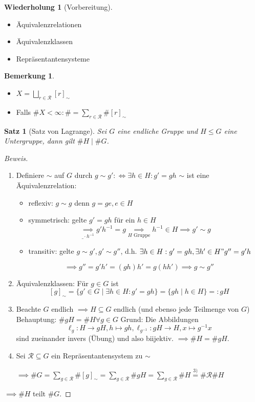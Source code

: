 \documentclass[a4paper]{report}
\theoremstyle{plain}
\newtheorem{satz}[thm]{Satz}
\theoremstyle{definition}
\newtheorem*{bem*}{Bemerkung}
\newtheorem*{whg*}{Wiederholung}
\begin{document}
\begin{whg*}[Vorbereitung]
  \item
\begin{itemize}
\item Äquivalenzrelationen
\item Äquivalenzklassen
\item Repräsentantensysteme
\end{itemize}
\end{whg*}

\begin{bem*} \item
  \begin{itemize}
        \item $X = \bigsqcup_{r \in \mathcal R} [r]_{\sim}$
        \item Falls $\#X < \infty : \# = \sum_{r \in \mathcal R} \# [r]_{\sim}$ %
  \end{itemize}
\end{bem*}

\begin{satz}[Satz von Lagrange]
Sei $G$ eine endliche Gruppe und $H \le G$ eine Untergruppe, dann gilt $\#H \mid \#G$.
\end{satz}
\begin{proof}[Beweis] \item
  \begin{enumerate} [1)]
    \item Definiere $\sim$ auf $G$ durch $g \sim g' :\iff \exists h \in H : g' = gh$
          $\sim$ ist eine Äquivalenzrelation:
          \begin{itemize}
            \item reflexiv: $g \sim g$ denn $g = ge, e \in H$
            \item symmetrisch: gelte $g' = gh$ für ein $h \in H$ $$\underset{\_\cdot h^{-1}}{\implies} g'h^{-1}=g \underset{H \text{ Gruppe}} \implies h^{-1} \in H \implies g' \sim g$$
            \item transitiv: gelte $g \sim g', g' \sim g''$, d.h. $\exists h \in H : g' = gh, \exists h' \in H " g'' = g'h$
          \end{itemize}
            $$\implies g'' = g'h' = (gh)h' = g(hh') \implies g \sim g''$$
    \item Äquivalenzklassen: Für $g \in G$ ist
    $$[g]_{\sim} = \{g' \in G \mid \exists h \in H : g' = gh\} = \{gh \mid h \in H\} =: gH$$
    \item Beachte $G$ endlich $\implies H \subseteq G$ endlich (und ebenso jede Teilmenge von $G$)
        Behauptung: $\#gH = \#H \forall g \in G$
        Grund: Die Abbildungen $$\ell_{g}: H \to gH, h \mapsto gh, \ell_{g^{-1}}: gH \to H, x \mapsto g^{-1}x$$ sind zueinander invers (Übung) und also biijektiv. $\implies \#H = \#gH$.
    \item Sei $\mathcal R \subseteq G$ ein Repräsentantensystem zu $\sim$

          $\implies \#G = \sum_{g \in \mathcal R} \# [g]_{\sim} = \sum_{g \in \mathcal R} \#gH = \sum_{g \in \mathcal R} \#H \overset{3)}= \# \mathcal R \# H$
  \end{enumerate}
$\implies \#H$ teilt $\#G$.
\end{proof}
\end{document}
